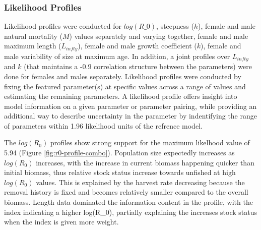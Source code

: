 \documentclass[11pt,
  english,
  a4paper,
]{article}
\begin{document}
\leavevmode\tagmcend\tagstructend\par


\hypertarget{likelihood-profiles}{%
\subsubsection{Likelihood Profiles}\label{likelihood-profiles}}

\leavevmode\tagmcend\tagstructend


Likelihood profiles were conducted for {\(log(R\_0)\)\leavevmode\tagmcend\tagstructend}, steepness ({\(h\)\leavevmode\tagmcend\tagstructend}), female and male natural mortality ({\(M\)\leavevmode\tagmcend\tagstructend}) values separately and varying together, female and male maximum length ({\(L_{infty}\)\leavevmode\tagmcend\tagstructend}), female and male growth coefficient ({\(k\)\leavevmode\tagmcend\tagstructend}), female and male variability of size at maximum age. In addition, a joint profiles over {\(L_{infty}\)\leavevmode\tagmcend\tagstructend} and {\(k\)\leavevmode\tagmcend\tagstructend} (that maintains a -0.9 correlation structure between the parameters) were done for females and males separately. Likelihood profiles were conducted by fixing the featured parameter(s) at specific values across a range of values and estimating the remaining parameters. A likelihood profile offers insight into model information on a given parameter or parameter pairing, while providing an additional way to describe uncertainty in the parameter by indentifying the range of parameters within 1.96 likelihood units of the refrence model.

\leavevmode\tagmcend\tagstructend\par


The {\(log(R_0)\)\leavevmode\tagmcend\tagstructend} profiles show strong support for the maximum likelhood value of 5.94 (Figure \ref{fig:r0-profile-combo}). Population size expectedly increases as {\(log(R_0)\)\leavevmode\tagmcend\tagstructend} increases, with the increase in current biomass happening quicker than initial biomass, thus relative stock status increase towards unfished at high {\(log(R_0)\)\leavevmode\tagmcend\tagstructend} values. This is explained by the harvest rate decreasing because the removal history is fixed and becomes relatively smaller compared to the overall biomass. Length data dominated the information content in the profile, with the index indicating a higher log(R\_0), partially explaining the increases stock status when the index is given more weight.
\end{document}
